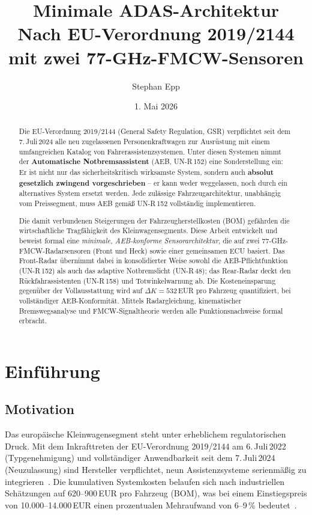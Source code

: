 \documentclass[a4paper,12pt]{article}
\title{\textbf{Minimale ADAS-Architektur} \\ Nach EU-Verordnung 2019/2144 mit zwei 77-GHz-FMCW-Sensoren}
\author{Stephan Epp}
\date{1. Mai 2026}
\theoremstyle{definition}
\begin{document}
\maketitle

\begin{abstract}
\noindent
Die EU-Verordnung 2019/2144 (General Safety Regulation, GSR) verpflichtet seit
dem 7.\,Juli\,2024 alle neu zugelassenen Personenkraftwagen zur Ausr\"ustung
mit einem umfangreichen Katalog von Fahrerassistenzsystemen. Unter diesen
Systemen nimmt der \textbf{Automatische Notbremsassistent} (AEB, UN-R\,152) eine
Sonderstellung ein: Er ist nicht nur das sicherheitskritisch wirksamste System,
sondern auch \textbf{absolut gesetzlich zwingend vorgeschrieben} -- er kann
weder weggelassen, noch durch ein alternatives System ersetzt werden.
Jede zul\"assige Fahrzeugarchitektur, unabh\"angig vom Preissegment, muss
AEB gem\"a\ss{} UN-R\,152 vollst\"andig implementieren.

Die damit verbundenen Steigerungen der Fahrzeugherstellkosten (BOM) gef\"ahrden
die wirtschaftliche Tragf\"ahigkeit des Kleinwagensegments.
Diese Arbeit entwickelt und beweist formal eine \emph{minimale, AEB-konforme
Sensorarchitektur}, die auf zwei 77-GHz-FMCW-Radarsensoren (Front und Heck)
sowie einer gemeinsamen ECU basiert.
Das Front-Radar \"ubernimmt dabei in konsolidierter Weise sowohl die
AEB-Pflichtfunktion (UN-R\,152) als auch das adaptive Notbremslicht (UN-R\,48);
das Rear-Radar deckt den R\"uckfahrassistenten (UN-R\,158) und
Totwinkelwarnung ab.
Die Kosteneinsparung gegen\"uber der Vollausstattung wird auf
$\Delta K = 532$\,EUR pro Fahrzeug quantifiziert, bei vollst\"andiger
AEB-Konformit\"at. Mittels Radargleichung, kinematischer Bremswegsanalyse
und FMCW-Signaltheorie werden alle Funktionsnachweise formal erbracht.
\end{abstract}

\tableofcontents
\newpage

\section{Einf\"uhrung}

\subsection{Motivation}

Das europ\"aische Kleinwagensegment steht unter erheblichem regulatorischen
Druck. Mit dem Inkrafttreten der EU-Verordnung 2019/2144 am 6.\,Juli\,2022
(Typgenehmigung) und vollst\"andiger Anwendbarkeit seit dem 7.\,Juli\,2024
(Neuzulassung) sind Hersteller verpflichtet, neun Assistenzsysteme
serienm\"a\ss{}ig zu integrieren~\cite{eu2019gsr}. Die kumulativen Systemkosten
belaufen sich nach industriellen Sch\"atzungen auf 620--900\,EUR pro Fahrzeug
(BOM), was bei einem Einstiegspreis von 10.000--14.000\,EUR einen prozentualen
Mehraufwand von 6--9\,\% bedeutet~\cite{adac2023kleinwagen}.
\end{document}
